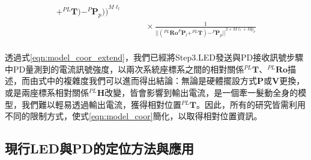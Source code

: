 \begin{equation}
\begin{aligned}
{                                                +^{PL}\boldsymbol{T}
                                            )
                                            - ^{P}\boldsymbol{P}_p
                                        )
                                    )
                                }^{M\ell_{l}}   \\
                        & \qquad \times
                            \frac{     
                                1   
                            } 
                            {
                                {
                                    ||
                                        (^{PL}\boldsymbol{Ro}^{P}\boldsymbol{P}_l+^{PL}\boldsymbol{T})
                                        - ^{P}\boldsymbol{P}_p
                                    ||
                                }^{2+M\ell_l+Mp_p}
                            }\\
                    \end{aligned}
                \end{equation}
    
    
    
            
        透過式\ref{eqn:model_coor_extend}，我們已經將Step3.LED發送與PD接收訊號步驟中PD量測到的電流訊號強度，以兩次系統座標系之間的相對關係$^{PL}\boldsymbol{T}$、$^{PL}\boldsymbol{Ro}$描述，而由式中的複雜度我們可以進而得出結論：無論是硬體擺設方式$\boldsymbol{P}$或$\boldsymbol{V}$更換，或是兩座標系相對關係$^{PL}\boldsymbol{H}$改變，皆會影響到輸出電流，是一個牽一髮動全身的模型，我們難以輕易透過輸出電流，獲得相對位置$^{PL}\boldsymbol{T}$。因此，所有的研究皆需利用不同的限制方式，使式\ref{eqn:model_coor}簡化，以取得相對位置資訊。
    
    
    
    
    
        
        


\subsection{現行LED與PD的定位方法與應用}
\label{chp:LEDPD_now}
            

